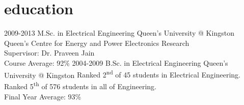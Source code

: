 
\section{education}

\begin{entrylist}
\entry
{2009-2013}
{M.Sc. {\normalfont in Electrical Engineering}}
{Queen's University @ Kingston}
{Queen’s Centre for Energy and Power Electronics Research\\
Supervisor: Dr. Praveen Jain\\
Course Average: 92\%}
{\vspace{-0.3cm}}
\entry
{2004-2009}
{B.Sc. {\normalfont in Electrical Engineering}}
{Queen's University @ Kingston}
{Ranked 2\textsuperscript{nd} of 45 students in Electrical Engineering.\\
Ranked 5\textsuperscript{th} of 576 students in all of Engineering.\\
Final Year Average: 93\%}
\end{entrylist}